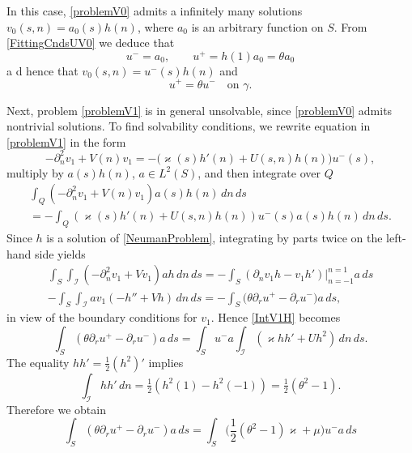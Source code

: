 \documentclass[reqno]{amsart}
\theoremstyle{plain}
\numberwithin{equation}{section}
\renewcommand{\kappa}{\varkappa}
\newcommand{\cI}{\mathcal{I}}
\newcommand{\pte}{\partial_n}
\begin{document}
In this case, \eqref{problemV0}  admits a infinitely many solutions $v_0(s,n)=a_0(s)h(n)$, where $a_0$ is an arbitrary function on $S$.
From \eqref{FittingCndsUV0} we deduce that
\begin{equation*}
  u^-=a_0, \qquad u^+=h(1) a_0=\theta a_0
\end{equation*}
a d hence that $v_0(s,n)=u^-(s)h(n)$ and
\begin{equation}\label{RCond0}
     u^+=\theta u^-\quad\text {on }\gamma.
\end{equation}



Next, problem \eqref{problemV1} is in general unsolvable, since \eqref{problemV0} admits  nontrivial solutions.  To find solvabi\-li\-ty conditions, we rewrite  equation in \eqref{problemV1} in the form
\begin{equation}\label{eqnV1Expand}
  -\pte^2 v_1+V(n)v_1=-\big(\kappa(s)h'(n)+U(s,n)h(n)\big)u^-(s),
\end{equation}
multiply  by $a(s)h(n)$, $a\in L^2(S)$,  and then integrate over $Q$
\begin{multline}\label{IntV1H}
\int_{Q}\left(-\pte^2 v_1+V(n)v_1\right)a(s)h(n)\,dn\,ds
\\
=
-\int_{Q}(\kappa(s)h'(n)+U(s,n)h(n))u^-(s)a(s)h(n)\, dn\,ds.
\end{multline}
Since $h$ is a solution of \eqref{NeumanProblem}, integrating by parts twice on the left-hand side yields
\begin{multline*}
\int_{S} \int_{\cI}\left(-\pte^2 v_1+Vv_1\right)a h\,dn \,ds
=-\int_{S}( \partial_n v_1 h-v_1 h')\big|_{n=-1}^{n=1}a\,ds\\-
\int_{S} \int_{\cI} a v_1\left(-h''+Vh\right)\,dn\,ds
=-\int_{S}\big(\theta\partial_r u^+-\partial_r u^-\big) a\,ds,
\end{multline*}
in view of the boundary conditions for $v_1$.
Hence \eqref{IntV1H} becomes
\begin{equation*}
\int_{S}\left(\theta\partial_r u^+-\partial_r u^-\right)a\,ds
=\int_{S} u^-a\int_{\cI}\left(\kappa hh'+U h^2\right)\,dn\,ds.
\end{equation*}
The equality  $hh'=\frac12 (h^2)'$ implies
\begin{equation}\label{IntHHpr}
\int_{\cI}hh'\,dn=\tfrac12 (h^2(1)-h^2(-1))=\tfrac{1}{2 }(\theta^2-1).
\end{equation}
 Therefore we obtain
\begin{equation*}
\int_{S}\left(\theta\partial_r u^+-\partial_r u^-\right)a\,ds
=\int_{S}\big(\textstyle\frac{1}{2}(\theta^2-1)\kappa+\mu \big)u^-a\,ds
\end{equation*}
\end{document}
